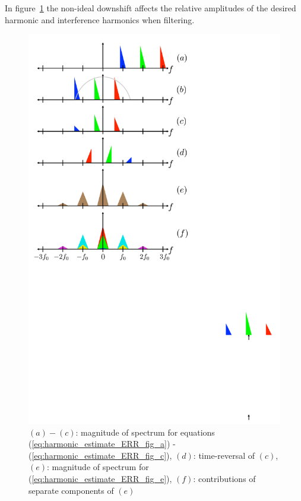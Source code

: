 \documentclass [11pt, proquest,oneside] {ganter_thesis}[2015/03/03]
\begin{document}
In figure~\ref{fig:downshift_effects} the non-ideal downshift affects the relative amplitudes of the desired harmonic and interference harmonics when filtering.  %

\begin{figure}[!ht]
  \centering
    \includegraphics[width=1\textwidth]{downshift_effects} 
    \caption{$(a)-(c)$: magnitude of spectrum for equations (\ref{eq:harmonic_estimate_ERR_fig_a}) - (\ref{eq:harmonic_estimate_ERR_fig_c}), $(d)$: time-reversal of $(c)$, $(e)$: magnitude of spectrum for (\ref{eq:harmonic_estimate_ERR_fig_e}), $(f)$: contributions of separate components of $(e)$}\label{fig:downshift_effects}
\end{figure}
\end{document}

